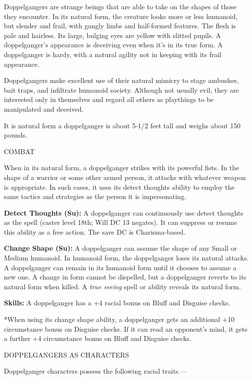 \documentclass{article}
\begin{document}
Doppelgangers are strange beings that are able to take on the shapes of those they 
encounter. In its natural form, the creature looks more or less humanoid, but slender 
and frail, with gangly limbs and half-formed features. The flesh is pale and hairless. 
Its large, bulging eyes are yellow with slitted pupils. A doppelganger's appearance 
is deceiving even when it's in its true form. A doppelganger is hardy, with a natural 
agility not in keeping with its frail appearance. 

Doppelgangers make excellent use of their natural mimicry to stage ambushes, bait 
traps, and infiltrate humanoid society. Although not usually evil, they are interested 
only in themselves and regard all others as playthings to be manipulated and deceived.

It is natural form a doppelganger is about 5-1/2 feet tall and weighs about 150 
pounds.

COMBAT

When in its natural form, a doppelganger strikes with its powerful fists. In the 
shape of a warrior or some other armed person, it attacks with whatever weapon 
is appropriate. In such cases, it uses its detect thoughts ability to employ the 
same tactics and strategies as the person it is impersonating.

\textbf{Detect Thoughts (Su):} A doppelganger can continuously use detect thoughts 
as the spell (caster level 18th; Will DC 13 negates). It can suppress or resume 
this ability as a free action. The save DC is Charisma-based.

\textbf{Change Shape (Su):} A doppelganger can assume the shape of any Small or 
Medium humanoid. In humanoid form, the doppelganger loses its natural attacks. 
A doppelganger can remain in its humanoid form until it chooses to assume a new 
one. A change in form cannot be dispelled, but a doppelganger reverts to its natural 
form when killed. A \textit{true seeing }spell or ability reveals its natural form.

\textbf{Skills:} A doppelganger has a +4 racial bonus on Bluff and Disguise checks. 

*When using its change shape ability, a doppelganger gets an additional +10 circumstance 
bonus on Disguise checks. If it can read an opponent's mind, it gets a further 
+4 circumstance bonus on Bluff and Disguise checks.

DOPPELGANGERS AS CHARACTERS

Doppelganger characters possess the following racial traits.--- 
\end{document}
